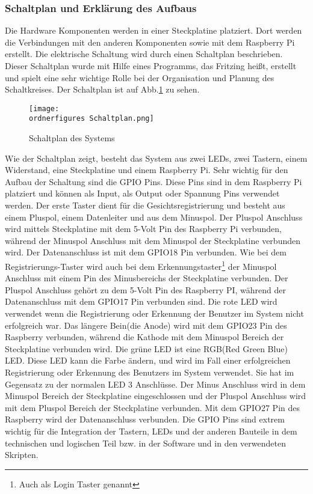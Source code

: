 \subsubsection{Schaltplan und Erklärung des Aufbaus}
Die Hardware Komponenten werden in einer Steckplatine platziert. Dort werden die Verbindungen mit den anderen Komponenten sowie mit dem Raspberry Pi erstellt. Die elektrische Schaltung wird durch einen Schaltplan beschrieben. Dieser Schaltplan wurde mit Hilfe eines Programms, das Fritzing heißt, erstellt und spielt eine sehr wichtige Rolle bei der Organisation und Planung des Schaltkreises. Der Schaltplan ist auf Abb.\ref{fig:Schaltplan} zu sehen.
\begin{figure}[H]
	\texttt{[image: \\ordnerfigures Schaltplan.png]}
	\caption{Schaltplan des Systems}
	\label{fig:Schaltplan}
\end{figure}
Wie der Schaltplan zeigt, besteht das System aus zwei LEDs, zwei Tastern, einem Widerstand, eine Steckplatine und einem Raspberry Pi. Sehr wichtig für den Aufbau der Schaltung sind die GPIO Pins. Diese Pins sind in dem Raspberry Pi platziert und können als Input, als Output oder Spannung Pins verwendet werden. 
Der erste Taster dient für die Gesichtsregistrierung und besteht aus einem Pluspol, einem Datenleiter und aus dem Minuspol. Der Pluspol Anschluss wird mittels Steckplatine mit dem 5-Volt Pin des Raspberry Pi verbunden, während der Minuspol Anschluss mit dem Minuspol der Steckplatine verbunden wird. Der Datenanschluss ist mit dem GPIO18 Pin verbunden. Wie bei dem Registrierungs-Taster wird auch bei dem Erkennungstaster\footnote{Auch als Login Taster genannt} der Minuspol Anschluss mit einem Pin des Minusbereichs der Steckplatine verbunden. Der Pluspol Anschluss gehört zu dem 5-Volt Pin des Raspberry PI, während der Datenanschluss mit dem GPIO17 Pin verbunden sind. Die rote LED wird verwendet wenn die Registrierung oder Erkennung der Benutzer im System nicht erfolgreich war. Das längere Bein(die Anode) wird mit dem GPIO23 Pin des Raspberry verbunden, während die Kathode mit dem Minuspol Bereich der Steckplatine verbunden wird. Die grüne LED ist eine RGB(Red Green Blue) LED. Diese LED kann die Farbe ändern, und wird im Fall einer erfolgreichen Registrierung oder Erkennung des Benutzers im System verwendet. Sie hat im Gegensatz zu der normalen LED 3 Anschlüsse. Der Minus Anschluss wird in dem Minuspol Bereich der Steckplatine eingeschlossen und der Pluspol Anschluss wird mit dem Pluspol Bereich der Steckplatine verbunden. Mit dem GPIO27 Pin des Raspberry wird der Datenanschluss verbunden. Die GPIO Pins sind extrem wichtig für die Integration der Tastern, LEDs und der anderen Bauteile in dem technischen und logischen Teil bzw. in der Software und in den verwendeten Skripten.	
